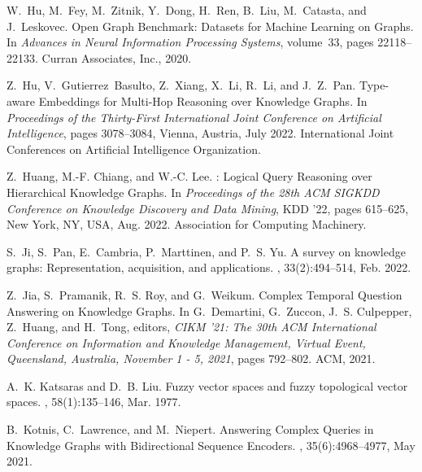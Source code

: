 \documentclass[11pt]{article}
\begin{document}
\begin{thebibliography}{10}
\begin{small}
W.~Hu, M.~Fey, M.~Zitnik, Y.~Dong, H.~Ren, B.~Liu, M.~Catasta, and J.~Leskovec.
\newblock Open {{Graph Benchmark}}: {{Datasets}} for {{Machine Learning}} on
  {{Graphs}}.
\newblock In {\em Advances in {{Neural Information Processing Systems}}},
  volume~33, pages 22118--22133. {Curran Associates, Inc.}, 2020.

Z.~Hu, V.~Gutierrez~Basulto, Z.~Xiang, X.~Li, R.~Li, and J.~Z.~Pan.
\newblock Type-aware {{Embeddings}} for {{Multi-Hop Reasoning}} over
  {{Knowledge Graphs}}.
\newblock In {\em Proceedings of the {{Thirty-First International Joint
  Conference}} on {{Artificial Intelligence}}}, pages 3078--3084, {Vienna,
  Austria}, July 2022. {International Joint Conferences on Artificial
  Intelligence Organization}.

Z.~Huang, M.-F. Chiang, and W.-C. Lee.
: {{Logical Query Reasoning}} over {{Hierarchical Knowledge
  Graphs}}.
\newblock In {\em Proceedings of the 28th {{ACM SIGKDD Conference}} on
  {{Knowledge Discovery}} and {{Data Mining}}}, {{KDD}} '22, pages 615--625,
  {New York, NY, USA}, Aug. 2022. {Association for Computing Machinery}.

S.~Ji, S.~Pan, E.~Cambria, P.~Marttinen, and P.~S. Yu.
\newblock A survey on knowledge graphs: Representation, acquisition, and
  applications.
,
  33(2):494--514, Feb. 2022.

Z.~Jia, S.~Pramanik, R.~S. Roy, and G.~Weikum.
\newblock Complex {{Temporal Question Answering}} on {{Knowledge Graphs}}.
\newblock In G.~Demartini, G.~Zuccon, J.~S. Culpepper, Z.~Huang, and H.~Tong,
  editors, {\em {{CIKM}} '21: {{The}} 30th {{ACM International Conference}} on
  {{Information}} and {{Knowledge Management}}, {{Virtual Event}},
  {{Queensland}}, {{Australia}}, {{November}} 1 - 5, 2021}, pages 792--802.
  {ACM}, 2021.

A.~K. Katsaras and D.~B. Liu.
\newblock Fuzzy vector spaces and fuzzy topological vector spaces.
,
  58(1):135--146, Mar. 1977.

B.~Kotnis, C.~Lawrence, and M.~Niepert.
\newblock Answering {{Complex Queries}} in {{Knowledge Graphs}} with
  {{Bidirectional Sequence Encoders}}.
,
  35(6):4968--4977, May 2021.


\end{small}
\end{thebibliography}
\end{document}
